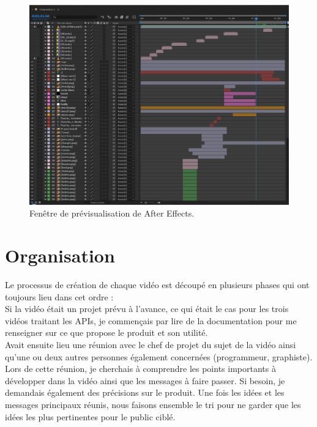 \begin{figure}[htp]
  \centering
  \includegraphics[width=15cm]{images/comp1.png}
  \caption{Fenêtre de prévisualisation de After Effects.}
  \label{ae1}
\end{figure}




\section{Organisation}
Le processus de création de chaque vidéo est découpé en plusieurs phases qui ont toujours lieu dans cet ordre :\\

Si la vidéo était un projet prévu à l'avance, ce qui était le cas pour les trois vidéos traitant les APIs, je commençais par lire de la documentation pour me renseigner sur ce que propose le produit et son utilité.\\

Avait ensuite lieu une réunion avec le chef de projet du sujet de la vidéo ainsi qu'une ou deux autres personnes également concernées (programmeur, graphiste). Lors de cette réunion, je cherchais à comprendre les points importants à développer dans la vidéo ainsi que les messages à faire passer. Si besoin, je demandais également des précisions sur le produit. Une fois les idées et les messages principaux réunis, nous faisons ensemble le tri pour ne garder que les idées les plus pertinentes pour le public ciblé.\\





